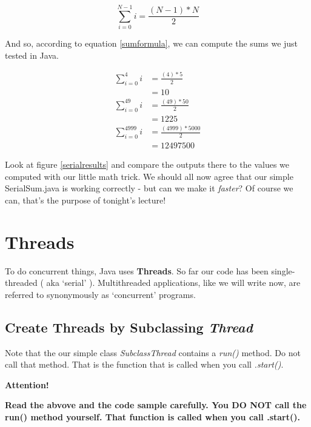 \documentclass[12pt]{article}
\begin{document}
\begin{equation}
\label{sumformula}
	\sum_{i=0}^{N-1}i = \frac{(N-1)*N}{2}
\end{equation}

And so, according to equation \ref{sumformula}, we can compute the sums we just
tested in Java.

\begin{align*}
	\sum_{i=0}^{4}i &= \frac{(4)*5}{2} \\
					&= 10 \\
	\sum_{i=0}^{49}i &= \frac{(49)*50}{2} \\
					 &= 1225 \\
	\sum_{i=0}^{4999}i &= \frac{(4999)*5000}{2} \\
					&= 12497500
\end{align*}

Look at figure \ref{serialresults} and compare the outputs there to the values
we computed with our little math trick. We should all now agree that our simple
SerialSum.java is working correctly - but can we make it \textit{faster}? Of
course we can, that's the purpose of tonight's lecture!

\section{Threads}
To do concurrent things, Java uses \textbf{Threads}. So far our code has been
single-threaded ( aka `serial' ). Multithreaded applications, like we will write
now, are referred to synonymously as `concurrent' programs.

\subsection{Create Threads by Subclassing \textit{Thread}}

Note that the our simple class \textit{SubclassThread} contains a \textit{run()}
method. Do not call that method. That is the function that is called when you
call \textit{.start()}. 


\begin{center}
{\Large\textbf{Attention!}}

\textbf{Read the abvove and the code sample
carefully. You DO NOT call the run() method yourself. That function is called
when you call .start().}
\end{center}


\end{document}
